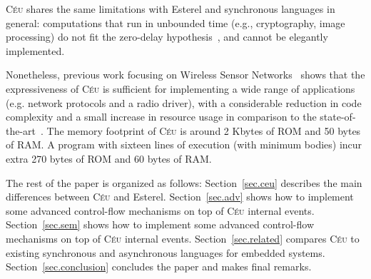 \documentclass{acm_proc_article-sp}
\newcommand{\CEU}{\textsc{C\'{e}u}\xspace}
\newcommand{\1}{\;}
\newcommand{\2}{\;\;}
\newcommand{\3}{\;\;\;}
\newcommand{\5}{\;\;\;\;\;}
\begin{document}
\begin{comment}
We present a formal semantics for the control primitives of \CEU.

 and discuss an
alternative to Esterel's abortion primitive that is required for dataflow 
support.
This modification makes lines of executions to rejoin in an equivalent way to 
topological traversal in dependency graphs of dataflow 
languages~\cite{rp.twelve,frp.survey}.
%
We also show that, based on the stacked execution for internal events, \CEU can 
describe mutual data dependency without requiring an explicit \emph{delay} 
operator to break cycles~\cite{frtime.embedding,luagravity.sblp}.
\end{comment}


\CEU shares the same limitations with Esterel and synchronous languages in 
general:
computations that run in unbounded time (e.g., cryptography, image processing) 
do not fit the zero-delay hypothesis~\cite{rp.hypothesis}, and cannot be 
elegantly implemented.

Nonetheless, previous work focusing on Wireless Sensor 
Networks~\cite{ceu.sensys} shows that the expressiveness of \CEU is sufficient 
for implementing a wide range of applications (e.g. network protocols and a 
radio driver), with a considerable reduction in code complexity and a small 
increase in resource usage in comparison to the 
state-of-the-art~\cite{wsn.nesc}.
%
The memory footprint of \CEU is around 2 Kbytes of ROM and 50 bytes of RAM.
A program with sixteen lines of execution (with minimum bodies) incur extra 270 
bytes of ROM and 60 bytes of RAM.

The rest of the paper is organized as follows:
Section~\ref{sec.ceu} describes the main differences between \CEU and 
Esterel.
Section~\ref{sec.adv} shows how to implement some advanced control-flow 
mechanisms on top of \CEU internal events.
Section~\ref{sec.sem} shows how to implement some advanced control-flow 
mechanisms on top of \CEU internal events.
Section~\ref{sec.related} compares \CEU to existing synchronous and 
asynchronous languages for embedded systems.
Section~\ref{sec.conclusion} concludes the paper and makes final remarks.
\end{document}
